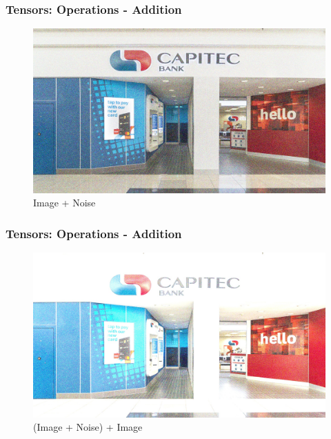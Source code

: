 \documentclass[11pt]{beamer}
\begin{document}
\begin{frame}
	\frametitle{Tensors: Operations - Addition}
	\begin{figure}
		\includegraphics[scale=0.17]{"3 - gn_img"}
		\caption{Image + Noise}
	\end{figure}
\end{frame}

\begin{frame}
	\frametitle{Tensors: Operations - Addition}
	\begin{figure}
		\includegraphics[scale=0.17]{"4 - gn_img_avg"}
		\caption{(Image + Noise) + Image}
	\end{figure}
\end{frame}
\end{document}
